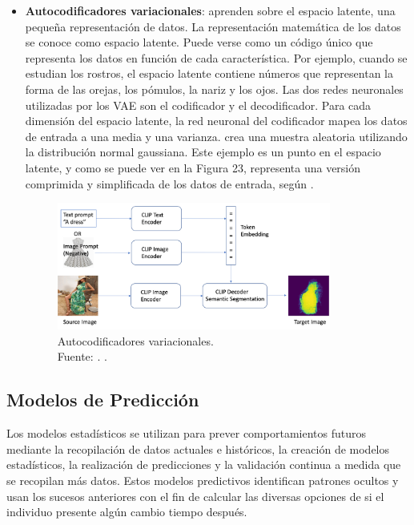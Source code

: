 \begin{itemize}
	\item \textbf{Autocodificadores variacionales}: aprenden sobre el espacio latente, una pequeña representación de datos. La representación matemática de los datos se conoce como espacio latente. Puede verse como un código único que representa los datos en función de cada característica. Por ejemplo, cuando se estudian los rostros, el espacio latente contiene números que representan la forma de las orejas, los pómulos, la nariz y los ojos. Las dos redes neuronales utilizadas por los VAE son el codificador y el decodificador. Para cada dimensión del espacio latente, la red neuronal del codificador mapea los datos de entrada a una media y una varianza. crea una muestra aleatoria utilizando la distribución normal gaussiana. Este ejemplo es un punto en el espacio latente, y como se puede ver en la Figura 23, representa una versión comprimida y simplificada de los datos de entrada, según \parencite{tec_amaz2023iagen}.
	
	\begin{figure}[!ht]
		\begin{center}
			\includegraphics[width=0.85\textwidth]{2/figures/autocodificadoresvariacionales.png}
			\caption[Autocodificadores variacionales]{Autocodificadores variacionales.\\
			Fuente: \cite{tec_amaz2023iagen}. .}
			\label{2:fig9}
		\end{center}
	\end{figure}
\end{itemize}


\subsection{Modelos de Predicción}

Los modelos estadísticos se utilizan para prever comportamientos futuros mediante la recopilación de datos actuales e históricos, la creación de modelos estadísticos, la realización de predicciones y la validación continua a medida que se recopilan más datos. Estos modelos predictivos identifican patrones ocultos y usan los sucesos anteriores con el fin de calcular las diversas opciones de si el individuo presente algún cambio tiempo después. \parencite{gl_gartner2019pm}

